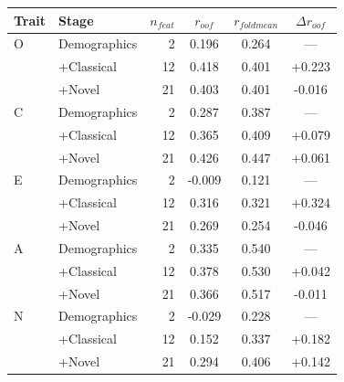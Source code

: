 \begin{tabular}{llrccc}
\toprule
Trait & Stage & $n_{feat}$ & $r_{oof}$ & $r_{foldmean}$ & $\Delta r_{oof}$ \\
\midrule
O & Demographics & 2 & 0.196 & 0.264 & --- \\
 & +Classical & 12 & 0.418 & 0.401 & +0.223 \\
 & +Novel & 21 & 0.403 & 0.401 & -0.016 \\
\midrule
C & Demographics & 2 & 0.287 & 0.387 & --- \\
 & +Classical & 12 & 0.365 & 0.409 & +0.079 \\
 & +Novel & 21 & 0.426 & 0.447 & +0.061 \\
\midrule
E & Demographics & 2 & -0.009 & 0.121 & --- \\
 & +Classical & 12 & 0.316 & 0.321 & +0.324 \\
 & +Novel & 21 & 0.269 & 0.254 & -0.046 \\
\midrule
A & Demographics & 2 & 0.335 & 0.540 & --- \\
 & +Classical & 12 & 0.378 & 0.530 & +0.042 \\
 & +Novel & 21 & 0.366 & 0.517 & -0.011 \\
\midrule
N & Demographics & 2 & -0.029 & 0.228 & --- \\
 & +Classical & 12 & 0.152 & 0.337 & +0.182 \\
 & +Novel & 21 & 0.294 & 0.406 & +0.142 \\
\bottomrule
\end{tabular}
